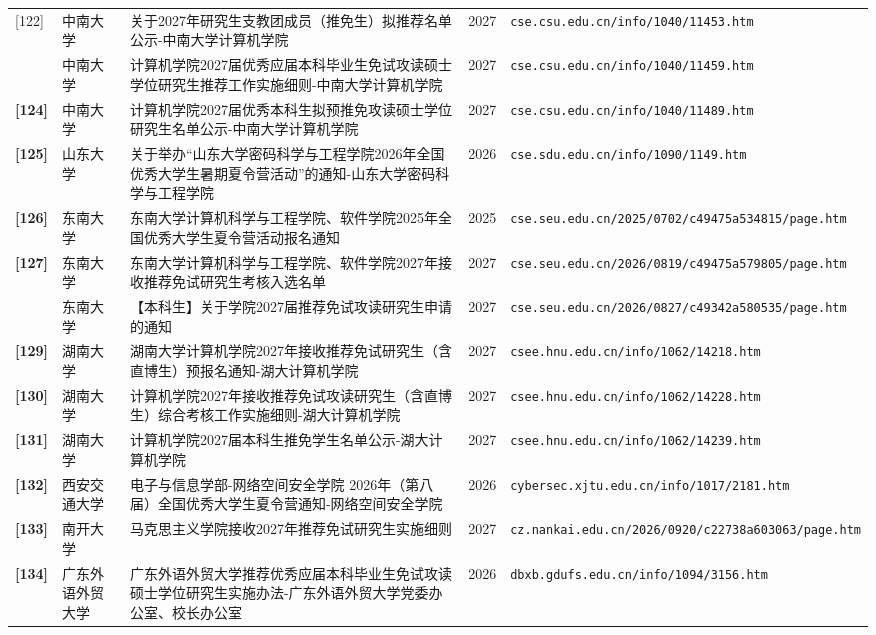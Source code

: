 {\begin{longtable}{@{}p{1.15cm}p{2.9cm}p{6.3cm}p{0.85cm}p{5.0cm}@{}}
[122] & 中南大学 & 关于2027年研究生支教团成员（推免生）拟推荐名单公示-中南大学计算机学院 & 2027 & \texttt{cse.csu.edu.cn/info/1040/11453.htm} \\
[123] & 中南大学 & 计算机学院2027届优秀应届本科毕业生免试攻读硕士学位研究生推荐工作实施细则-中南大学计算机学院 & 2027 & \texttt{cse.csu.edu.cn/info/1040/11459.htm} \\
\textbf{[124]} & 中南大学 & 计算机学院2027届优秀本科生拟预推免攻读硕士学位研究生名单公示-中南大学计算机学院 & 2027 & \texttt{cse.csu.edu.cn/info/1040/11489.htm} \\
\textbf{[125]} & 山东大学 & 关于举办“山东大学密码科学与工程学院2026年全国优秀大学生暑期夏令营活动”的通知-山东大学密码科学与工程学院 & 2026 & \texttt{cse.sdu.edu.cn/info/1090/1149.htm} \\
\textbf{[126]} & 东南大学 & 东南大学计算机科学与工程学院、软件学院2025年全国优秀大学生夏令营活动报名通知 & 2025 & \texttt{cse.seu.edu.cn/2025/0702/c49475a534815/page.htm} \\
\textbf{[127]} & 东南大学 & 东南大学计算机科学与工程学院、软件学院2027年接收推荐免试研究生考核入选名单 & 2027 & \texttt{cse.seu.edu.cn/2026/0819/c49475a579805/page.htm} \\
[128] & 东南大学 & 【本科生】关于学院2027届推荐免试攻读研究生申请的通知 & 2027 & \texttt{cse.seu.edu.cn/2026/0827/c49342a580535/page.htm} \\
\textbf{[129]} & 湖南大学 & 湖南大学计算机学院2027年接收推荐免试研究生（含直博生）预报名通知-湖大计算机学院 & 2027 & \texttt{csee.hnu.edu.cn/info/1062/14218.htm} \\
\textbf{[130]} & 湖南大学 & 计算机学院2027年接收推荐免试攻读研究生（含直博生）综合考核工作实施细则-湖大计算机学院 & 2027 & \texttt{csee.hnu.edu.cn/info/1062/14228.htm} \\
\textbf{[131]} & 湖南大学 & 计算机学院2027届本科生推免学生名单公示-湖大计算机学院 & 2027 & \texttt{csee.hnu.edu.cn/info/1062/14239.htm} \\
\textbf{[132]} & 西安交通大学 & 电子与信息学部-网络空间安全学院 2026年（第八届）全国优秀大学生夏令营通知-网络空间安全学院 & 2026 & \texttt{cybersec.xjtu.edu.cn/info/1017/2181.htm} \\
\textbf{[133]} & 南开大学 & 马克思主义学院接收2027年推荐免试研究生实施细则 & 2027 & \texttt{cz.nankai.edu.cn/2026/0920/c22738a603063/page.htm} \\
\textbf{[134]} & 广东外语外贸大学 & 广东外语外贸大学推荐优秀应届本科毕业生免试攻读硕士学位研究生实施办法-广东外语外贸大学党委办公室、校长办公室 & 2026 & \texttt{dbxb.gdufs.edu.cn/info/1094/3156.htm} \\

\end{longtable}}

